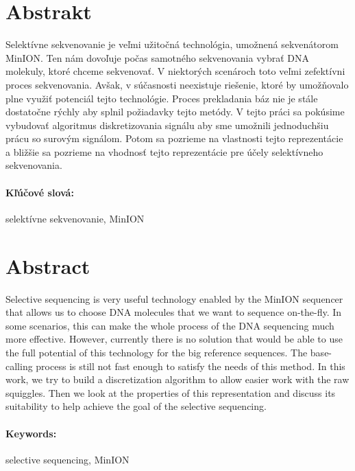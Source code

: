\documentclass[12pt, twoside]{book}
\begin{document}

\newpage 
\section*{Abstrakt}


Selektívne sekvenovanie je veľmi užitočná technológia, umožnená sekvenátorom MinION.
Ten nám dovoľuje počas samotného sekvenovania vybrať DNA molekuly, ktoré chceme sekvenovať.
V niektorých scenároch toto veľmi zefektívni proces sekvenovania. Avšak, v súčasnosti neexistuje
riešenie, ktoré by umožňovalo plne využiť potenciál tejto technológie. Proces prekladania
báz nie je stále dostatočne rýchly aby splnil požiadavky tejto metódy. V tejto práci
sa pokúsime vybudovať algoritmus diskretizovania signálu aby sme umožnili jednoduchšiu
prácu so surovým signálom. Potom sa pozrieme na vlastnosti tejto reprezentácie a
bližšie sa pozrieme na vhodnosť tejto reprezentácie pre účely selektívneho sekvenovania.

\paragraph*{Kľúčové slová:} selektívne sekvenovanie, MinION


\newpage 
\section*{Abstract}

Selective sequencing is very useful technology enabled by the MinION sequencer
that allows us to choose DNA molecules that we want to sequence on-the-fly.
In some scenarios, this can make the whole process of the DNA sequencing much more effective.
However, currently there is no solution that would be able to use the full
potential of this technology for the big reference sequences. The base-calling
process is still not fast enough to satisfy the needs of this method. In this work,
we try to build a discretization algorithm to allow easier work with the raw squiggles.
Then we look at the properties of this representation and discuss its suitability
to help achieve the goal of the selective sequencing.

\paragraph*{Keywords:} selective sequencing, MinION
\end{document}
